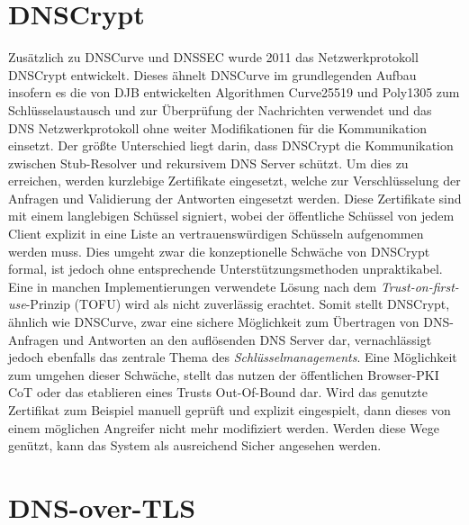 \section{DNSCrypt}

Zusätzlich zu DNSCurve und DNSSEC wurde 2011 das Netzwerkprotokoll DNSCrypt entwickelt. Dieses ähnelt DNSCurve im grundlegenden Aufbau insofern es die von DJB entwickelten Algorithmen Curve25519 und Poly1305 zum Schlüsselaustausch und zur Überprüfung der Nachrichten verwendet und das DNS Netzwerkprotokoll ohne weiter Modifikationen für die Kommunikation einsetzt. Der größte Unterschied liegt darin, dass DNSCrypt die Kommunikation zwischen Stub-Resolver und rekursivem DNS Server schützt. Um dies zu erreichen, werden kurzlebige Zertifikate eingesetzt, welche zur Verschlüsselung der Anfragen und Validierung der Antworten eingesetzt werden. Diese Zertifikate sind mit einem langlebigen Schüssel signiert, wobei der öffentliche Schüssel von jedem Client explizit in eine Liste an vertrauenswürdigen Schüsseln aufgenommen werden muss.\cite{Denis2016} Dies umgeht zwar die konzeptionelle Schwäche von DNSCrypt formal, ist jedoch ohne entsprechende Unterstützungsmethoden unpraktikabel. Eine in manchen Implementierungen verwendete Lösung nach dem \textit{Trust-on-first-use}-Prinzip (TOFU) wird als nicht zuverlässig erachtet.\cite{Wendlandt2008} Somit stellt DNSCrypt, ähnlich wie DNSCurve, zwar eine sichere  Möglichkeit zum Übertragen von DNS-Anfragen und Antworten an den auflösenden DNS Server dar, vernachlässigt jedoch ebenfalls das zentrale Thema des \textit{Schlüsselmanagements}. Eine Möglichkeit zum umgehen dieser Schwäche, stellt das nutzen der öffentlichen Browser-PKI CoT oder das etablieren eines Trusts Out-Of-Bound dar. Wird das genutzte Zertifikat zum Beispiel manuell geprüft und explizit eingespielt, dann dieses von einem möglichen Angreifer nicht mehr modifiziert werden. Werden diese Wege genützt, kann das System als ausreichend Sicher angesehen werden.

\section{DNS-over-TLS}

